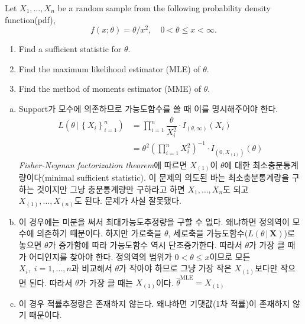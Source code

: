 \documentclass[answers]{exam}
\begin{document}
\begin{questions}
\begin{solution}
\begin{enumerate}[(a)]
\begin{equation}
    		\end{equation}
    	\end{enumerate}
    \end{solution}
    \question
    Let $X_{1},\ldots,X_{n}$ be a random sample from the following probability density function(pdf),
    $$
      f\left(x;\theta\right)=\theta/x^{2},\quad 0<\theta\leq x<\infty.
    $$
    \begin{enumerate}
      \item Find a sufficient statistic for $\theta$.
      \item Find the maximum likelihood estimator (MLE) of $\theta$.
      \item Find the method of moments estimator (MME) of $\theta$.
    \end{enumerate}
    \begin{solution}
    	\begin{enumerate}[(a)]
    		\item Support가 모수에 의존하므로 가능도함수를 쓸 때 이를 명시해주어야 한다.
    		\begin{align}
    			L\left(\theta\,|\,\left\{X_{i}\right\}_{i=1}^{n}\right) &= \prod_{i=1}^{n}\dfrac{\theta}{X_{i}^{2}}\cdot I_{\left(\theta,\infty\right)}\left(X_{i}\right)\\
    			&= \theta^{2}\left(\prod_{i=1}^{n}X_{i}^{2}\right)^{-1}\cdot I_{\left(0,X_{\left(1\right)}\right)}\left(\theta\right)
    		\end{align}
    		\emph{Fisher-Neyman factorization theorem}에 따르면 $X_{\left(1\right)}$이 $\theta$에 대한 최소충분통계량이다(minimal sufficient statistic). 이 문제의 의도된 바는 최소충분통계량을 구하는 것이지만 그냥 충분통계량만 구하라고 하면 $X_{1},\ldots,X_{n}$도 되고 $X_{(1)},\ldots,X_{(n)}$도 된다. 문제가 사실 잘못됐다.
    		\item 이 경우에는 미분을 써서 최대가능도추정량을 구할 수 없다. 왜냐하면 정의역이 모수에 의존하기 때문이다. 하지만 가로축을 $\theta$, 세로축을 가능도함수($L\left(\theta\,|\,\mathbf{X}\right)$)로 놓으면 $\theta$가 증가함에 따라 가능도함수 역시 단조증가한다. 따라서 $\theta$가 가장 클 때가 어디인지를 찾아야 한다. 정의역의 범위가 $0<\theta\leq x$이므로 모든 $X_{i},\;i=1,\ldots,n$과 비교해서 $\theta$가 작아야 하므로 그냥 가장 작은 $X_{\left(1\right)}$보다만 작으면 된다. 따라서 $\theta$가 가장 클 때는 $X_{\left(1\right)}$이다. $\widehat{\theta}^{\text{MLE}}=X_{\left(1\right)}$
    		\item 이 경우 적률추정량은 존재하지 않는다. 왜냐하면 기댓값(1차 적률)이 존재하지 않기 때문이다.
    		\begin{align}

\end{align}
\end{enumerate}
\end{solution}
\end{questions}
\end{document}
